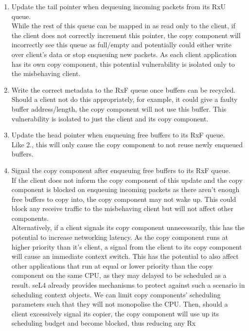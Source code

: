 \begin{enumerate}
    \item Update the tail pointer when dequeuing incoming packets from its RxU queue.\\
    While the rest of this queue can be mapped in as read only to the client, if the client does not correctly increment this pointer,
    the copy component will incorrectly see this queue as full/empty and potentially could either write over client's data or stop
    enqueuing new packets. As each client application has its own copy component, this potential vulnerability is isolated only to
    the misbehaving client.
    \item Write the correct metadata to the RxF queue once buffers can be recycled.\\ 
    Should a client not do this appropriately, for example, it could give a faulty buffer address/length, the copy component will not 
    use this buffer. This vulnerability is isolated to just the client and its copy component.
    \item Update the head pointer when enqueuing free buffers to its RxF queue.\\
    Like 2., this will only cause the copy component to not reuse newly enqueued buffers.
    \item Signal the copy component after enqueuing free buffers to its RxF queue.\\
    If the client does not inform the copy component of this update and the copy component is blocked on enqueuing incoming packets as there
    aren't enough free buffers to copy into, the copy component may not wake up. This could block any receive traffic to the misbehaving client
    but will not affect other components.\\
    Alternatively, if a client signals its copy component unnecessarily, this has the potential to increase networking latency. 
    As the copy component runs at higher priority than it's client, a signal from the client to its copy component will cause an immediate context
    switch. This has the potential to also affect other applications that run at equal or lower priority than the copy component on 
    the same CPU, as they may delayed to be scheduled as a result. seL4 already provides mechanisms to protect against such a scenario in 
    scheduling context objects. We can limit copy components' scheduling parameters such that they will not monopolise the CPU. Then, should 
    a client excessively signal its copier, the copy component will use up its scheduling budget and become blocked, thus reducing any Rx 

\end{enumerate}
